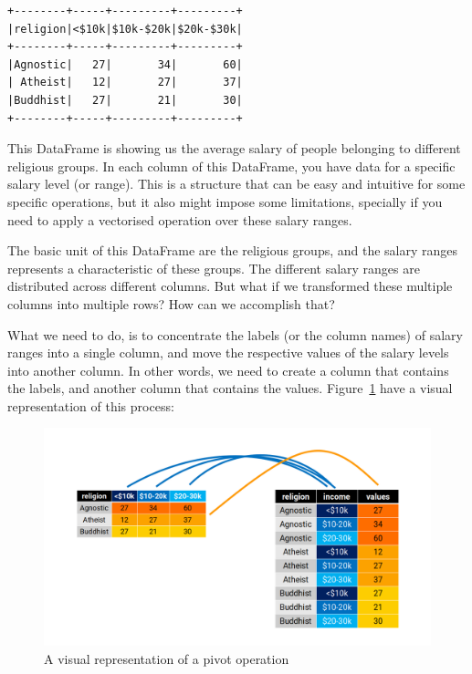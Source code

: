 \documentclass[
  11pt,
  letterpaper,
  DIV=11,
  numbers=noendperiod]{scrreprt}
\begin{document}
\begin{verbatim}
+--------+-----+---------+---------+
|religion|<$10k|$10k-$20k|$20k-$30k|
+--------+-----+---------+---------+
|Agnostic|   27|       34|       60|
| Atheist|   12|       27|       37|
|Buddhist|   27|       21|       30|
+--------+-----+---------+---------+
\end{verbatim}

This DataFrame is showing us the average salary of people belonging to
different religious groups. In each column of this DataFrame, you have
data for a specific salary level (or range). This is a structure that
can be easy and intuitive for some specific operations, but it also
might impose some limitations, specially if you need to apply a
vectorised operation over these salary ranges.

The basic unit of this DataFrame are the religious groups, and the
salary ranges represents a characteristic of these groups. The different
salary ranges are distributed across different columns. But what if we
transformed these multiple columns into multiple rows? How can we
accomplish that?

What we need to do, is to concentrate the labels (or the column names)
of salary ranges into a single column, and move the respective values of
the salary levels into another column. In other words, we need to create
a column that contains the labels, and another column that contains the
values. Figure~\ref{fig-pivot1} have a visual representation of this
process:

\begin{figure}

{\centering \includegraphics{Chapters/./../Figures/pivot1.png}

}

\caption{\label{fig-pivot1}A visual representation of a pivot operation}

\end{figure}
\end{document}
